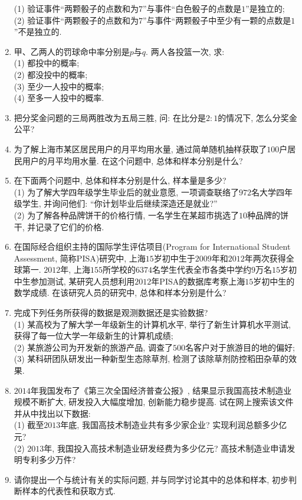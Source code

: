 \documentclass[10pt,a4paper]{article}
\begin{document}
\begin{enumerate}[1.]
(1) 验证事件``两颗骰子的点数和为$7$''与事件``白色骰子的点数是$1$''是独立的;\\
(2) 验证事件``两颗骰子的点数和为$7$''与事件``两颗骰子中至少有一颗的点数是$1$''不是独立的.
\item 甲、乙两人的罚球命中率分别是$p$与$q$. 两人各投篮一次, 求:\\
(1) 都投中的概率;\\
(2) 都没投中的概率;\\
(3) 至少一人投中的概率;\\
(4) 至多一人投中的概率.
\item 把分奖金问题的三局两胜改为五局三胜, 问: 在比分是$2:1$的情况下, 怎么分奖金公平?
\item 为了解上海市某区居民用户的月平均用水量, 通过简单随机抽样获取了$100$户居民用户的月平均用水量. 在这个问题中, 总体和样本分别是什么?
\item 在下面两个问题中, 总体和样本分别是什么, 样本量是多少?\\
(1) 为了解大学四年级学生毕业后的就业意愿, 一项调查联络了$972$名大学四年级学生, 并询问他们: ``你计划毕业后继续深造还是就业?''\\
(2) 为了解各种品牌饼干的价格行情, 一名学生在某超市挑选了$10$种品牌的饼干, 并记录了它们的价格.
\item 在国际经合组织主持的国际学生评估项目(Program for International Student Assessment, 简称PISA)研究中, 上海$15$岁初中生于$2009$年和$2012$年两次获得全球第一. $2012$年, 上海$155$所学校的$6374$名学生代表全市各类中学约$9$万名$15$岁初中生参加测试, 某研究人员想利用$2012$年PISA的数据库考察上海$15$岁初中生的数学成绩. 在该研究人员的研究中, 总体和样本分别是什么?
\item 完成下列任务所获得的数据是观测数据还是实验数据?\\
(1) 某高校为了解大学一年级新生的计算机水平, 举行了新生计算机水平测试, 获得了每一位大学一年级新生的计算机成绩;\\
(2) 某旅游公司为开发新的旅游产品, 调查了$500$名客户对于旅游目的地的偏好;\\
(3) 某科研团队研发出一种新型生态除草剂, 检测了该除草剂防控稻田杂草的效果.
\item $2014$年我国发布了《第三次全国经济普查公报》, 结果显示我国高技术制造业规模不断扩大, 研发投入大幅度增加, 创新能力稳步提高. 试在网上搜索该文件并从中找出以下数据:\\
(1) 截至$2013$年底, 我国高技术制造业共有多少家企业? 实现利润总额多少亿元?\\
(2) $2013$年, 我国投入高技术制造业研发经费为多少亿元? 高技术制造业申请发明专利多少万件?
\item 请你提出一个与统计有关的实际问题, 并与同学讨论其中的总体和样本, 初步判断样本的代表性和获取方式. 

\end{enumerate}
\end{document}
